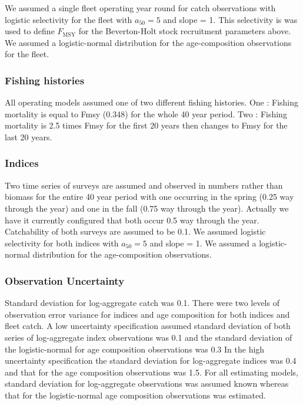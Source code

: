 \documentclass[
  12pt,
]{article}
\begin{document}
We assumed a single fleet operating year round for catch observations
with logistic selectivity for the fleet with \(a_{50} = 5\) and slope =
1. This selectivity is was used to define \(F_{\text{MSY}}\) for the
Beverton-Holt stock recruitment parameters above. We assumed a
logistic-normal distribution for the age-composition observations for
the fleet.

\hypertarget{fishing-histories}{%
\subsubsection{Fishing histories}\label{fishing-histories}}

All operating models assumed one of two different fishing histories. One
: Fishing mortality is equal to Fmsy (0.348) for the whole 40 year
period. Two : Fishing mortality is 2.5 times Fmsy for the first 20 years
then changes to Fmsy for the last 20 years.

\hypertarget{indices}{%
\subsubsection{Indices}\label{indices}}

Two time series of surveys are assumed and observed in numbers rather
than biomass for the entire 40 year period with one occurring in the
spring (0.25 way through the year) and one in the fall (0.75 way through
the year). Actually we have it currently configured that both occur 0.5
way through the year. Catchability of both surveys are assumed to be
0.1. We assumed logistic selectivity for both indices with
\(a_{50} = 5\) and slope = 1. We assumed a logistic-normal distribution
for the age-composition observations.

\hypertarget{observation-uncertainty}{%
\subsubsection{Observation Uncertainty}\label{observation-uncertainty}}

Standard deviation for log-aggregate catch was 0.1. There were two
levels of observation error variance for indices and age composition for
both indices and fleet catch. A low uncertainty specification assumed
standard deviation of both series of log-aggregate index observations
was 0.1 and the standard deviation of the logistic-normal for age
composition observations was 0.3 In the high uncertainty specification
the standard deviation for log-aggregate indices was 0.4 and that for
the age composition observations was 1.5. For all estimating models,
standard deviation for log-aggregate observations was assumed known
whereas that for the logistic-normal age composition observations was
estimated.
\end{document}
